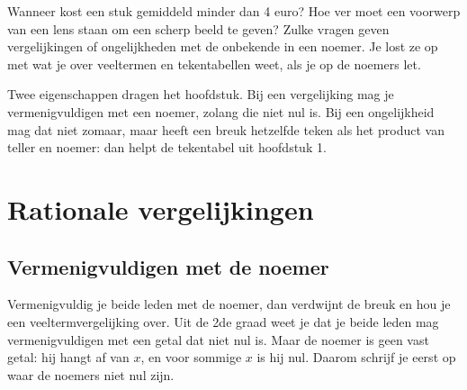 %



Wanneer kost een stuk gemiddeld minder dan 4 euro? Hoe ver moet een voorwerp van een lens staan om een scherp beeld te geven? Zulke vragen geven vergelijkingen of ongelijkheden met de onbekende in een noemer. Je lost ze op met wat je over veeltermen en tekentabellen weet, als je op de noemers let.

Twee eigenschappen dragen het hoofdstuk. Bij een vergelijking mag je vermenigvuldigen met een noemer, zolang die niet nul is. Bij een ongelijkheid mag dat niet zomaar, maar heeft een breuk hetzelfde teken als het product van teller en noemer: dan helpt de tekentabel uit hoofdstuk 1.

\begin{oefeningen}[Start]

\end{oefeningen}

\section{Rationale vergelijkingen}

\subsection{Vermenigvuldigen met de noemer}

Vermenigvuldig je beide leden met de noemer, dan verdwijnt de breuk en hou je een veeltermvergelijking over. Uit de 2de graad weet je dat je beide leden mag vermenigvuldigen met een getal dat niet nul is. Maar de noemer is geen vast getal: hij hangt af van $x$, en voor sommige $x$ is hij nul. Daarom schrijf je eerst op waar de noemers niet nul zijn.

